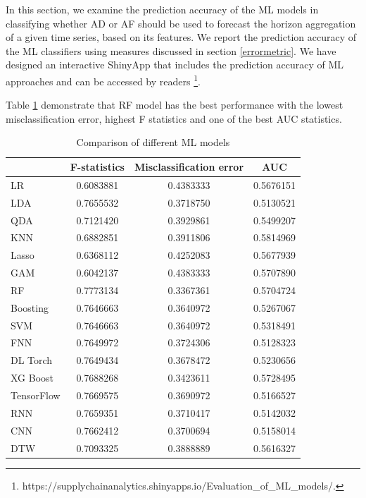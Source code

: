 \documentclass[preprint, 3p,
authoryear]{elsarticle} %
\begin{document}
In this section, we examine the prediction accuracy of the ML models in
classifying whether AD or AF should be used to forecast the horizon
aggregation of a given time series, based on its features. We report the
prediction accuracy of the ML classifiers using measures discussed in
section \ref{errormetric}. We have designed an interactive ShinyApp that
includes the prediction accuracy of ML approaches and can be accessed by
readers \footnote{https://supplychainanalytics.shinyapps.io/Evaluation\_of\_ML\_models/.}.

Table \ref{tab:cost} demonstrate that RF model has the best performance
with the lowest misclassification error, highest F statistics and one of
the best AUC statistics.

\begin{table}
\caption{\label{tab:cost}Comparison of different ML models}
\centering
\begin{tabular}[t]{lccc}
\hline
 & F-statistics & Misclassification error & AUC\\
\hline
LR &  0.6083881 &  0.4383333 & 0.5676151\\
\hline
LDA & 0.7655532 & 0.3718750 & 0.5130521\\
\hline
QDA &  0.7121420 & 0.3929861 & 0.5499207\\
\hline
KNN &  0.6882851 & 0.3911806 & 0.5814969\\
\hline
Lasso & 0.6368112 & 0.4252083 & 0.5677939\\
\hline
GAM &  0.6042137 & 0.4383333 & 0.5707890\\
\hline
RF & 0.7773134 & 0.3367361 & 0.5704724\\
\hline
Boosting & 0.7646663 & 0.3640972 & 0.5267067\\
\hline
SVM & 0.7646663 & 0.3640972 & 0.5318491\\
\hline
FNN & 0.7649972 & 0.3724306 & 0.5128323\\
\hline
DL Torch & 0.7649434 & 0.3678472 & 0.5230656\\
\hline
XG Boost & 0.7688268 & 0.3423611 & 0.5728495\\
\hline
TensorFlow & 0.7669575 & 0.3690972 & 0.5166527\\
\hline
RNN & 0.7659351 & 0.3710417 & 0.5142032\\
\hline
CNN & 0.7662412 & 0.3700694 & 0.5158014\\
\hline
DTW & 0.7093325 & 0.3888889 & 0.5616327\\
\hline
\end{tabular}
\end{table}
\end{document}
